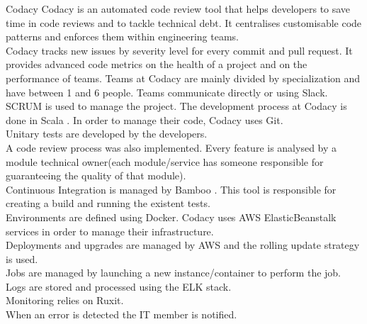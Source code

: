     \begin{companyreport}{Codacy}
      \product
      Codacy is an automated code review tool that helps developers to save time in code reviews and to tackle technical debt. It centralises customisable code patterns and enforces them within engineering teams. \\
      Codacy tracks new issues by severity level for every commit and pull request. It provides advanced code metrics on the health of a project and on the performance of teams.
      \teams
      Teams at Codacy are mainly divided by specialization and have between 1 and 6  people. Teams communicate directly or using Slack.
      SCRUM is used to manage the project.
      \development
      The development process at Codacy is done in Scala . In order to manage their code, Codacy uses Git. \\
      Unitary tests are developed by the developers.\\
      A code review process was also implemented. Every feature is analysed by a module technical owner(each module/service has someone responsible for guaranteeing the quality of that module).\\
      Continuous Integration is managed by Bamboo . This tool is  responsible for creating a build and running the existent tests. \\
      Environments are defined using Docker.
      \operations
      Codacy uses AWS ElasticBeanstalk services in order to manage their infrastructure. \\
      Deployments and upgrades are managed by AWS and the rolling update strategy is used. \\
      Jobs are managed by launching a new instance/container to perform the job. \\
      Logs are stored and processed using the ELK stack. \\
      Monitoring relies on Ruxit. \\
      When an error is detected the IT member is notified.
      \reportend
    \end{companyreport}

